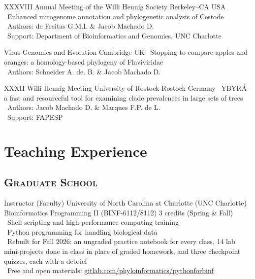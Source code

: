 \documentclass[11pt, letterpaper, sans]{moderncv}
\begin{document}
\vspace{.5em}

	{XXXVIII Annual Meeting of the Willi Hennig Society}
	{Berkeley--CA}
	{USA}
	{}
	{
		\textbullet~Enhanced mitogenome annotation and phylogenetic analysis of Cestode\\
		\textbullet~Authors: de Freitas G.M.I. \& Jacob Machado D.\\
		\textbullet~Support: Department of Bioinformatics and Genomics,  UNC Charlotte
	}

\vspace{.5em}

	{Virus Genomics and Evolution}
	{Cambridge}
	{UK}
	{}
	{
		\textbullet~Stopping to compare apples and oranges: a homology-based phylogeny of Flaviviridae \\
		\textbullet~Authors: Schneider A. de. B. \& Jacob Machado D.
}

\vspace{.5em}

	{XXXII Willi Hennig Meeting}
	{University of Rostock}
	{Rostock}
	{Germany}
	{
		\textbullet~YBYRÁ - a fast and resourceful tool for examining clade prevalences in large sets of trees\\
		\textbullet~Authors: Jacob Machado D. \& Marques F.P. de L.\\
		\textbullet~Support: FAPESP
}

\section{Teaching Experience}

\vspace{.5em}
	\subsection{\textsc{Graduate School}}
\vspace{.5em}

	{Instructor (Faculty)}
	{University of North Carolina at Charlotte (UNC Charlotte)}
	{Bioinformatics Programming II (BINF-6112/8112)}
	{3 credits (Spring \& Fall)}
	{
		\textbullet~Shell scripting and high-performance computing training\\
        \textbullet~Python programming for handling biological data\\
        \textbullet~Rebuilt for Fall 2026: an ungraded practice notebook for every class, 14 lab mini-projects done in class in place of graded homework, and three checkpoint quizzes, each with a debrief\\
        \textbullet~Free and open materials: \href{https://gitlab.com/phyloinformatics/pythonforbinf}{gitlab.com/phyloinformatics/pythonforbinf}
	}
\end{document}
